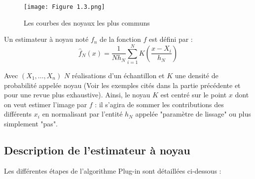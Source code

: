 \begin{figure}[!ht]
  \centering
  \texttt{[image: Figure 1.3.png]}
  \caption{Les courbes des noyaux les plus communs}
  \label{fig:figure3}
\end{figure}

Un estimateur à noyau noté $f_n$ de la fonction $f$ est défini par : 
\begin{equation}
\hat{f}_N(x) = \frac{1}{N h_N} \sum_{i=1}^N K\left(\frac{x-X_i}{h_N}\right)
\end{equation}

Avec $(X_1, \dots, X_n)$ $N$ réalisations d’un échantillon et $K$ une densité de probabilité appelée noyau (Voir les exemples cités dans la partie précédente et  pour une revue plus exhaustive). Ainsi, le noyau $K$ est centré sur le point $x$ dont on veut estimer l’image par $f$ : il s’agira de sommer les contributions des différents $x_i$ en normalisant par l’entité $h_N$ appelée "paramètre de lissage" ou plus simplement "pas".

\subsection{Description de l’estimateur à noyau }
Les différentes étapes de l'algorithme Plug-in sont détaillées ci-dessous :

